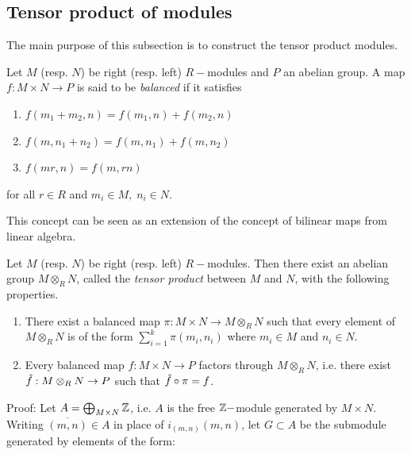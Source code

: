 \subsection{Tensor product of modules}
The main purpose of this subsection is to construct the tensor product modules. 
\begin{dang}
    \begin{definition}\cite{curtis1966representation}
        Let $M$ (resp. $N$) be right (resp. left) $R-$modules and $P$ an abelian group. A map $f:M\times N\rightarrow P$ is said to be \textit{balanced} if it satisfies
        \begin{enumerate}
            \item[(1)] $f(m_1+m_2,n)=f(m_1,n)+f(m_2,n)$
            \item[(2)] $f(m,n_1+n_2)=f(m,n_1)+f(m,n_2)$
            \item[(3)] $f(mr,n)=f(m,rn)$
        \end{enumerate}
        for all $r\in R$ and $m_i\in M,\;n_i\in N$.
    \end{definition}
\end{dang}
This concept can be seen as an extension of the concept of bilinear maps from linear algebra. 
\begin{dang}
    \begin{theorem}\label{theorem: existence of tensor products}\cite{curtis1966representation}
        Let $M$ (resp. $N$) be right (resp. left) $R-$modules. Then there exist an abelian group $M\otimes_RN$, called the \textit{tensor product} between $M$ and $N$, with the following properties. 
        \begin{enumerate}
            \item[(1)] There exist a balanced map $\pi: M\times N\rightarrow M\otimes_R N$ such that every element of $M\otimes_R N$ is of the form $\sum_{i=1}^k\pi(m_i,n_i)$ where $m_i\in M$ and $n_i\in N$.
            \item[(2)] Every balanced map $f: M\times N\rightarrow P$ factors through $M\otimes_R N$, i.e. there exist $\Tilde{f}: M\otimes_RN\rightarrow P$ such that
            $\Tilde{f}\circ\pi=f$.
        \end{enumerate}
    \end{theorem}   
\end{dang}
Proof: Let $A=\bigoplus_{M\times N}\mathbb{Z}$, i.e. $A$ is the free $\mathbb{Z}-$module generated by $M\times N$. Writing $\overline{(m,n)}\in A$ in place of $i_{(m,n)}(m,n)$,  let $G\subset A$ be the submodule generated by elements of the form:
